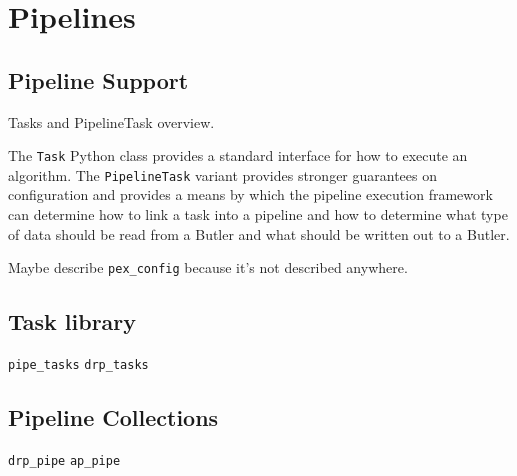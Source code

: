 \section{Pipelines}

\subsection{Pipeline Support}

Tasks and PipelineTask overview.

The \texttt{Task} Python class provides a standard interface for how to execute an algorithm.
The \texttt{PipelineTask} variant provides stronger guarantees on configuration and provides a means by which the pipeline execution framework can determine how to link a task into a pipeline and how to determine what type of data should be read from a Butler and what should be written out to a Butler.

Maybe describe \texttt{pex\_config} because it's not described anywhere.

\subsection{Task library}

\texttt{pipe\_tasks}
\texttt{drp\_tasks}

\subsection{Pipeline Collections}

\texttt{drp\_pipe}
\texttt{ap\_pipe}
